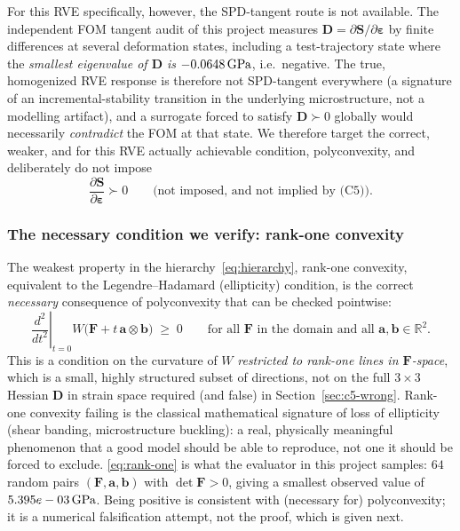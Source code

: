 \documentclass[10pt,a4paper]{article}
\newcommand{\R}{\mathbb{R}}
\begin{document}
For this RVE specifically, however, the SPD-tangent route is not
available. The independent FOM tangent audit of this project measures
$\bm D=\partial\bm S/\partial\bm\varepsilon$ by finite differences at
several deformation states, including a test-trajectory state
where the \emph{smallest eigenvalue of $\bm D$ is $-0.0648\,\mathrm{GPa}$},
i.e.\ negative. The true, homogenized RVE response is therefore not
SPD-tangent everywhere (a signature of an incremental-stability
transition in the underlying microstructure, not a modelling artifact),
and a surrogate forced to satisfy $\bm D\succ0$ globally would
necessarily \emph{contradict} the FOM at that state. We therefore target
the correct, weaker, and for this RVE actually achievable condition,
polyconvexity, and deliberately do not impose
\begin{equation}
 \frac{\partial\bm S}{\partial\bm\varepsilon}\succ0 \qquad\text{(not imposed, and not implied by (C5))}.
 \label{eq:not-spd}
\end{equation}

\subsubsection{The necessary condition we verify: rank-one convexity}
\label{sec:c5-implies}
The weakest property in the hierarchy~\eqref{eq:hierarchy}, rank-one
convexity, equivalent to the Legendre--Hadamard (ellipticity)
condition, is the correct \emph{necessary} consequence of
polyconvexity that can be checked pointwise:
\begin{equation}
 \left.\frac{d^2}{dt^2}\right|_{t=0} W\big(\bm F+t\,\bm a\otimes\bm b\big)\;\geq\;0
 \qquad\text{for all }\bm F\text{ in the domain and all }\bm a,\bm b\in\R^2 .
 \label{eq:rank-one}
\end{equation}
This is a condition on the curvature of $W$ \emph{restricted to
rank-one lines in $\bm F$-space}, which is a small, highly structured subset
of directions, not on the full $3\times3$ Hessian $\bm D$ in strain
space required (and false) in Section~\ref{sec:c5-wrong}. Rank-one
convexity failing is the classical mathematical signature of loss of
ellipticity (shear banding, microstructure buckling): a real, physically
meaningful phenomenon that a good model should be able to reproduce, not
one it should be forced to exclude. \eqref{eq:rank-one} is what the
evaluator in this project samples: $64$ random pairs $(\bm F,\bm a,\bm b)$ with $\det
\bm F>0$, giving a smallest observed value of $5.395e-03\,\mathrm{GPa}$. Being
positive is consistent with (necessary for) polyconvexity; it is a
numerical falsification attempt, not the proof, which is given next.
\end{document}
